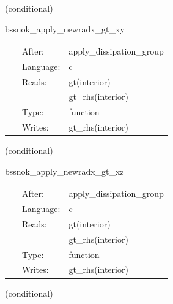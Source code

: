 \documentclass{article}
\begin{document}
\vspace{5mm}

   (conditional) 

\hspace{5mm} bssnok\_apply\_newradx\_gt\_xy 



\hspace{5mm}

 \begin{tabular*}{160mm}{cll} 
~ & After:  & apply\_dissipation\_group \\ 
~ & Language:  & c \\ 
~ & Reads:  & gt(interior) \\ 
~& ~ &gt\_rhs(interior)\\ 
~ & Type:  & function \\ 
~ & Writes:  & gt\_rhs(interior) \\ 
\end{tabular*} 


\vspace{5mm}

   (conditional) 

\hspace{5mm} bssnok\_apply\_newradx\_gt\_xz 



\hspace{5mm}

 \begin{tabular*}{160mm}{cll} 
~ & After:  & apply\_dissipation\_group \\ 
~ & Language:  & c \\ 
~ & Reads:  & gt(interior) \\ 
~& ~ &gt\_rhs(interior)\\ 
~ & Type:  & function \\ 
~ & Writes:  & gt\_rhs(interior) \\ 
\end{tabular*} 


\vspace{5mm}

   (conditional) 
\end{document}
